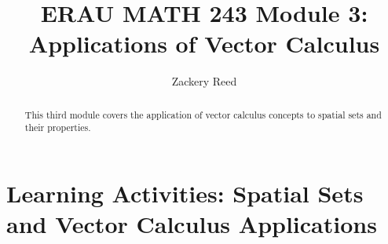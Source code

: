 \documentclass{ximera}
\title{ERAU MATH 243 Module 3: Applications of Vector Calculus}
\author{Zackery Reed}
\begin{document}
\begin{abstract}
This third module covers the application of vector calculus concepts to spatial sets and their properties.
\end{abstract}
\maketitle

\part{Learning Activities: Spatial Sets and Vector Calculus Applications}
\sectionstyle


\end{document}
